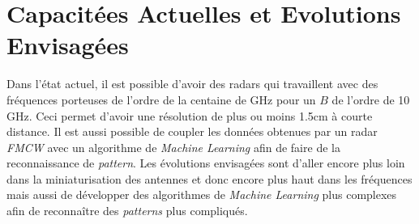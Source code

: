 \section{Capacitées Actuelles et Evolutions Envisagées}

Dans l'état actuel, il est possible d'avoir des radars qui travaillent avec des fréquences porteuses de l'ordre de la centaine de GHz pour un $B$ de l'ordre de 10 GHz. Ceci permet d'avoir une résolution de plus ou moins 1.5cm à courte distance. Il est aussi possible de coupler les données obtenues par un radar \textit{FMCW} avec un algorithme de \textit{Machine Learning} afin de faire de la reconnaissance de \textit{pattern}. Les évolutions envisagées sont d'aller encore plus loin dans la miniaturisation des antennes et donc encore plus haut dans les fréquences mais aussi de développer des algorithmes de \textit{Machine Learning} plus complexes afin de reconnaître des \textit{patterns} plus compliqués.   
